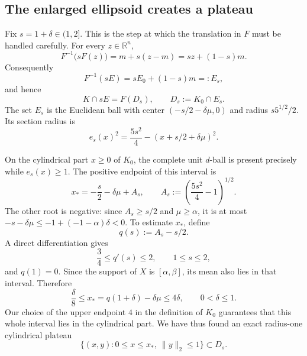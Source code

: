 \documentclass[11pt]{article}
\numberwithin{equation}{section}
\theoremstyle{definition}
\begin{document}
\subsection{The enlarged ellipsoid creates a plateau}
\label{app:counterexample:enlarged-ellipsoid}

Fix $s=1+\delta\in(1,2]$.
This is the step at which the translation in $F$ must be handled carefully.
For every $z\in\mathbb{R}^n$,
\[
F^{-1}\bigl(sF(z)\bigr)
=m+s(z-m)
=sz+(1-s)m.
\]
Consequently
\begin{equation}
F^{-1}(sE)
=sE_0+(1-s)m
=:E_s,
\label{app:counterexample:eq:pullback-ellipsoid}
\end{equation}
and hence
\begin{equation}
K\cap sE=F(D_s),
\qquad
D_s:=K_0\cap E_s.
\label{app:counterexample:eq:enlarged-intersection}
\end{equation}
The set $E_s$ is the Euclidean ball with center
$(-s/2-\delta\mu,0)$ and radius
$s5^{1/2}/2$.
Its section radius is
\begin{equation}
\label{app:counterexample:eq:enlarged-section-radius}
  e_s(x)^2=\frac{5s^2}{4}-(x+s/2+\delta\mu)^2.
\end{equation}

On the cylindrical part $x\geq 0$ of
$K_0$, the complete unit
$d$-ball is present precisely while
$e_s(x)\geq 1$.
The positive endpoint of this interval is
\begin{equation}
x_*=-\frac{s}{2}-\delta\mu+A_s,
\qquad
A_s:=\left(\frac{5s^2}{4}-1\right)^{1/2}.
\label{app:counterexample:eq:plateau-endpoint}
\end{equation}
The other root is negative: since $A_s\geq s/2$ and
$\mu\geq\alpha$, it is at most
$-s-\delta\mu\leq-1+(-1-\alpha)\delta<0$.
To estimate $x_*$, define
\[
  q(s):=A_s-s/2.
\]
A direct differentiation gives
\[
\frac34
\leq q'(s)
\leq 2,
\qquad
1
\leq s
\leq 2,
\]
and $q(1)=0$.
Since the support of $X$ is
$[\alpha,\beta]$, its mean also lies in that interval.
Therefore
\begin{equation}
\frac{\delta}{8}
\leq x_*
=q(1+\delta)-\delta\mu
\leq 4\delta,
\qquad
0
<\delta
\leq 1.
\label{app:counterexample:eq:endpoint-bounds}
\end{equation}
Our choice of the upper endpoint $4$ in the definition of
$K_0$ guarantees that this whole interval lies in the cylindrical part.
We have thus found an exact radius-one cylindrical plateau
\begin{equation}
\label{app:counterexample:eq:plateau-set}
  \{(x,y):0\leq x\leq x_*,\ \lVert y\rVert_2\leq 1\}\subset D_s.
\end{equation}
\end{document}
